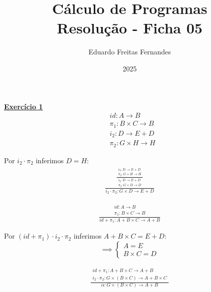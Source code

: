 \documentclass[a4paper,11pt]{article}
\title{Cálculo de Programas \\ Resolução - Ficha 05}
\author{Eduardo Freitas Fernandes}
\date{2025}
\begin{document}
	
	\maketitle
	

	\noindent \underline{\textbf{Exercício 1}}
	\[
	\begin{aligned}
		&id : A \rightarrow B \\
		&\pi_1 : B \times C \rightarrow B \\
		&i_2 : D \rightarrow E + D \\
		&\pi_2 : G \times H \rightarrow H
	\end{aligned}
	\]
	
	\noindent Por $ i_2 \cdot \pi_2 $ inferimos $D = H$:
	\[
	\begin{aligned}
		\frac{
			\frac{
				\begin{array}{c}
					i_2 : D \rightarrow E + D \\
					\pi_2 : G \times H \rightarrow H
				\end{array}
			}
			{
				\begin{array}{c}
					i_2 : D \rightarrow E + D \\
					\pi_2 : G \times D \rightarrow D
				\end{array}
			}
		}
		{
			i_2 \cdot \pi_2 : G \times D \rightarrow E + D
		}
	\end{aligned}
	\]

	\[
	\begin{aligned}
		\frac{
			\begin{array}{c}
				id : A \rightarrow B \\
				\pi_1 : B \times C \rightarrow B
			\end{array}
		}
		{
			id + \pi_1 : A + B \times C \rightarrow A + B
		}
	\end{aligned}
	\]
	
	\noindent Por $ (id + \pi_1) \cdot i_2 \cdot \pi_2 $ inferimos $ A + B \times C = E + D $:
	\[
	\implies
	\begin{cases}
		A = E \\
		B \times C = D
	\end{cases}	
	\]
	
	\[
	\begin{aligned}
		\frac{
			\begin{array}{c}
				id + \pi_1 : A + B \times C \rightarrow A + B \\
				i_2 \cdot \pi_2 : G \times (B \times C) \rightarrow A + B \times C
			\end{array}
		}
		{
			\alpha : G \times (B \times C) \rightarrow A + B
		}
	\end{aligned}
	\]
	
\end{document}
